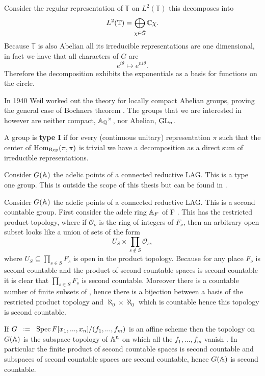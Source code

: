 \begin{example}
	Consider the regular representation of \(\mathbb{T}\) on \(L^2(\mathbb{T})\) this decomposes into 
	\[L^2(\mathbb{T}) = \bigoplus_{\chi\in \hat{G}}  \C \chi .\]
	Because \(\mathbb{T}\) is also Abelian all its irreducible representations are one dimensional, in fact we have that all characters of \(G\) are 
	\[e^{i\theta} \mapsto e^{ni\theta}.\]
	Therefore the decomposition exhibits the exponentials as a basis for functions on the circle.
\end{example}

In 1940 Weil worked out the theory for locally compact Abelian groups, proving the general case of Bochners theorem \cite[Thm. 4.18]{follandCourseAbstractHarmonic2016a}. The groups that we are interested in however are neither compact,  \(\A_\Q^\times\), nor Abelian, \(\operatorname{GL}_n\).

A group is \textbf{type I} if for every (continuous unitary) representation \(\pi\) such that the center of \(\operatorname{Hom}_\mathrm{Rep}(\pi, \pi)\) is trivial we have a decomposition as a  direct sum of irreducible representations. 

\begin{example}
	Consider \(G(\A)\) the adelic points of a connected reductive LAG. This is a type one group. This is outside the scope of this thesis but can be found in \cite[Thm. 1.7 + Thm. 2.3]{deitmarTraceClassGroups2017}.
\end{example}

\begin{example}
	Consider \(G(\A)\) the adelic points of a connected reductive LAG. This is a second countable group. First consider the adele ring \(\A_F\) of F . This has the restricted product topology, where if \(\mathcal{O}_\nu\) is the ring of integers of \(F_\nu\), then an arbitrary open subset looks like a union of sets of the form 
	\[U_S \times \prod_{s\notin S} \mathcal{O}_s,\]
	where \(U_S\subseteq \prod_{s\in S}F_s\) is open in the product topology. 
	Because for any place \(F_\nu\) is second countable and the product of second countable spaces is second countable it is clear that \(\prod_{s\in S} F_s\) is second countable. Moreover there is a countable number of finite subsets of \Z, hence there is a bijection between a basis of the restricted product topology and \(\aleph_0\times \aleph_0 \) which is countable hence this topology is second countable.
	
	If \(G \defeq \Spec F[x_1, ..., x_n]/(f_1, ..., f_m)\) is an affine scheme then the topology on \(G(\A)\) is the subspace topology of \(\A^n\) on which all the \(f_1, ..., f_m\) vanish \cite{conradWeilGrothendieckApproaches2012}. In particular the finite product of second countable spaces is second countable and subspaces of second countable spaces are second countable, hence \(G(\A)\) is second countable. 
\end{example}

